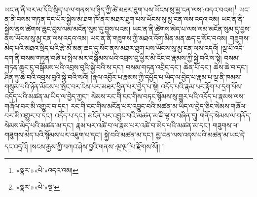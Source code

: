 ཡང་ན་ནི་བར་མ་དོའི་སྲིད་པ་ལ་གནས་པ་ཉིད་ཀྱི་ཚེ་མཐར་ཐུག་པས་ཡོངས་སུ་མྱ་ངན་ལས་:འདའ་བའམ།\footnote{«སྣར་»«པེ་»འདའ་འམ།} ཡང་ན་ནི་བསམ་གཏན་དང་པོར་སྐྱེས་མ་ཐག་ཁོ་ནར་མཐར་ཐུག་པས་ཡོངས་སུ་མྱ་ངན་ལས་འདའ་འམ། ཡང་ན་ནི་སྐྱེས་ནས་ཚེགས་ཆུང་ངུས་ལམ་མངོན་སུམ་དུ་བྱས་པའམ། ཡང་ན་ནི་ཚེགས་མེད་པ་ལས་ལམ་མངོན་སུམ་དུ་བྱས་ནས་ཡོངས་སུ་མྱ་ངན་ལས་འདའ་འམ། ཡང་ན་ནི་གཟུགས་ཀྱི་མཐའ་འོག་མིན་མན་ཆད་དུ་སོང་བའམ། གཟུགས་མེད་པའི་མཐའ་སྲིད་པའི་རྩེ་མོ་མན་ཆད་དུ་སོང་ནས་མཐར་ཐུག་པས་ཡོངས་སུ་མྱ་ངན་ལས་འདའོ། །ལྔ་པོ་འདི་དག་ནི་བསམ་གཏན་བཞི་པ་སྤེལ་མར་བསྒོམས་པའི་འབྲས་བུ་ཕྱིར་མི་འོང་བ་རྣམས་ཀྱི་སྐྱེ་བའི་ས་སྟེ། བསམ་གཏན་ཆུང་ངུ་བསྒོམས་པའི་འབྲས་བུའི་སྐྱེ་བའི་ས་དང་། བསམ་གཏན་འབྲིང་དང་། ཆེན་པོ་དང་། ཆེས་ཆེ་བ་དང་། ཤིན་ཏུ་ཆེ་བའི་འབྲས་བུའི་སྐྱེ་བའི་སའོ། །རྣལ་འབྱོར་པ་རྣམས་ཀྱི་དཔྱོད་པ་ཡིད་ལ་བྱེད་པ་རྣམ་པ་ལྔ་ནི་ཁམས་གསུམ་པའི་ཉོན་མོངས་པ་སྤང་བར་ངེས་པར་མཐར་ཕྱིན་པར་བྱེད་པ་སྟེ། འདོད་པའི་རྣམ་པར་རྟོག་པ་དྲག་པོས་འདོད་པའི་མཚན་མ་ཡིད་ལ་བྱེད་ཀྱང་། སེམས་རང་གི་ངང་གིས་བཏང་སྙོམས་སུ་གྱུར་པའི་འདོད་པ་རྣམས་ལས་གཞོལ་བར་མི་འགྱུར་བ་དང་། རང་གི་ངང་གིས་མངོན་པར་འབྱུང་བའི་མཚན་མ་ཡིད་ལ་བྱེད་ཅིང་སེམས་གཞོལ་བར་མི་འགྱུར་བ་དང་། འདོད་པ་དང་། མངོན་པར་འབྱུང་བའི་མཚན་མ་ཇི་ལྟ་བ་བཞིན་དུ། གནོད་སེམས་ལ་གནོད་སེམས་མེད་པའི་མཚན་མ་དང་། རྣམ་པར་འཚེ་བ་ལ་རྣམ་པར་འཚེ་བ་མེད་པའི་མཚན་མ་དང་། གཟུགས་ལ་གཟུགས་མེད་པའི་སྙོམས་པར་འཇུག་པ་དང་། སྐྱེ་བའི་མཚན་མ་དང་། མྱ་ངན་ལས་འདས་པའི་མཚན་མ་ཡང་དེ་དང་འདྲའོ། །སངས་རྒྱས་ཀྱི་བཀའ་ཤེས་བྱའི་གནས་:ལྔ་ལྔ་\footnote{«སྣར་»«པེ་»ལྔ་}པ་རྫོགས་སོ།། །
